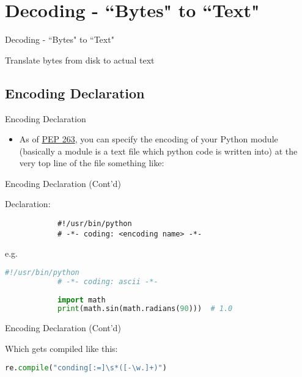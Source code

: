 \section{Decoding - ``Bytes" to ``Text"}
\begin{frame}{Decoding - ``Bytes" to ``Text"}
    \begin{itemize}
        {\LARGE \item[-] Translate bytes from disk to actual text}
    \end{itemize}
\end{frame}

\subsection{Encoding Declaration}
\begin{frame}{Encoding Declaration}
    \begin{itemize}
        \item[-] As of \href{https://peps.python.org/pep-0263/}{PEP 263}, you can specify the encoding of your Python module (basically a module is a text
        file which python code is written into) at the very top line of the file something like:
    \end{itemize}
\end{frame}

\begin{frame}[fragile]{Encoding Declaration (Cont'd)}
    
    \begin{flushleft}
        Declaration:
        \begin{lstlisting}
            #!/usr/bin/python
            # -*- coding: <encoding name> -*-
        \end{lstlisting}
    \end{flushleft}
    
    \begin{flushleft}
        e.g.
        \begin{lstlisting}[language=python, keywordstyle=\color{Mulberry}\textbf]
            #!/usr/bin/python
            # -*- coding: ascii -*-
            
            import math
            print(math.sin(math.radians(90)))  # 1.0
        \end{lstlisting}
    \end{flushleft}
\end{frame}

\begin{frame}[fragile]{Encoding Declaration (Cont'd)}
    \begin{flushleft}
        Which gets compiled like this:
        \begin{lstlisting}[language=python]
            re.compile("conding[:=]\s*([-\w.]+)")
        \end{lstlisting}
    \end{flushleft}
\end{frame}

